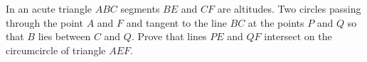 In an acute triangle $ ABC$ segments $ BE$ and $ CF$ are altitudes. Two circles passing through the point $ A$ and $ F$ and tangent to the line $ BC$ at the points $ P$ and $ Q$ so that $ B$ lies between $ C$ and $ Q$. Prove that lines $ PE$ and $ QF$ intersect on the circumcircle of triangle $ AEF$.